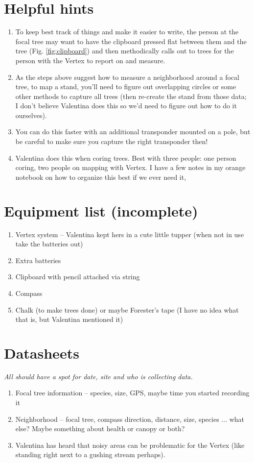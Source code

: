 \documentclass[11pt]{article}
\begin{document}
\section*{Helpful hints}
\begin{enumerate}
\item To keep best track of things and make it easier to write, the person at the focal tree may want to have the clipboard pressed flat between them and the tree (Fig. \ref{fig:clipboard}) and then methodically calls out to trees for the person with the Vertex to report on and measure. 
\item As the steps above suggest how to measure a neighborhood around a focal tree, to map a stand, you'll need to figure out overlapping circles or some other methods to capture all trees (then re-create the stand from those data; I don't believe Valentina does this so we'd need to figure out how to do it ourselves). 
\item You can do this faster with an additional transponder mounted on a pole, but be careful to make sure you capture the right transponder then!
\item Valentina does this when coring trees. Best with three people: one person coring, two people on mapping with Vertex. I have a few notes in my orange notebook on how to organize this best if we ever need it, 
\end{enumerate}

\section*{Equipment list (incomplete)}
\begin{enumerate}
\item Vertex system -- Valentina kept hers in a cute little tupper (when not in use take the batteries out)
\item Extra batteries
\item Clipboard with pencil attached via string
\item Compass 
\item Chalk (to make trees done) or maybe Forester's tape (I have no idea what that is, but Valentina mentioned it)
\end{enumerate}

\section*{Datasheets}
\emph{All should have a spot for date, site and who is collecting data.}
\begin{enumerate}
\item Focal tree information -- species, size, GPS, maybe time you started recording it 
\item Neighborhood -- focal tree, compass direction, distance, size, species ... what else? Maybe something about health or canopy or both?
\item Valentina has heard that noisy areas can be problematic for the Vertex (like standing right next to a gushing stream perhaps). 
\end{enumerate}
\end{document}

